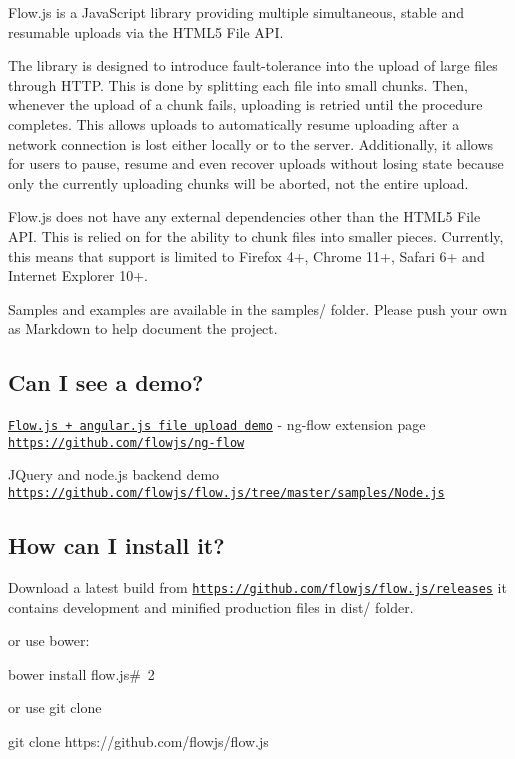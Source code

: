\href{https://saucelabs.com/u/flowjs}{\tt }

Flow.\+js is a Java\+Script library providing multiple simultaneous, stable and resumable uploads via the H\+T\+M\+L5 File A\+PI.

The library is designed to introduce fault-\/tolerance into the upload of large files through H\+T\+TP. This is done by splitting each file into small chunks. Then, whenever the upload of a chunk fails, uploading is retried until the procedure completes. This allows uploads to automatically resume uploading after a network connection is lost either locally or to the server. Additionally, it allows for users to pause, resume and even recover uploads without losing state because only the currently uploading chunks will be aborted, not the entire upload.

Flow.\+js does not have any external dependencies other than the {\ttfamily H\+T\+M\+L5 File A\+PI}. This is relied on for the ability to chunk files into smaller pieces. Currently, this means that support is limited to Firefox 4+, Chrome 11+, Safari 6+ and Internet Explorer 10+.

Samples and examples are available in the {\ttfamily samples/} folder. Please push your own as Markdown to help document the project.

\subsection*{Can I see a demo?}

\href{http://flowjs.github.io/ng-flow/}{\tt Flow.\+js + angular.\+js file upload demo} -\/ ng-\/flow extension page \href{https://github.com/flowjs/ng-flow}{\tt https\+://github.\+com/flowjs/ng-\/flow}

J\+Query and node.\+js backend demo \href{https://github.com/flowjs/flow.js/tree/master/samples/Node.js}{\tt https\+://github.\+com/flowjs/flow.\+js/tree/master/samples/\+Node.\+js}

\subsection*{How can I install it?}

Download a latest build from \href{https://github.com/flowjs/flow.js/releases}{\tt https\+://github.\+com/flowjs/flow.\+js/releases} it contains development and minified production files in {\ttfamily dist/} folder.

or use bower\+: 
\begin{DoxyCode}
bower install flow.js#~2
\end{DoxyCode}
 or use git clone 
\begin{DoxyCode}
git clone https://github.com/flowjs/flow.js
\end{DoxyCode}
